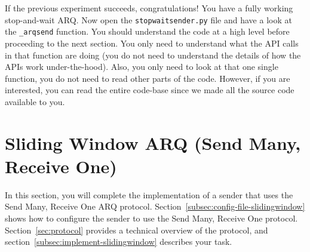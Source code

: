 \documentclass[11pt]{article}
\begin{document}




If the previous experiment succeeds, congratulations! You have a fully working stop-and-wait ARQ.
Now open the \texttt{stopwaitsender.py} file and have a look at the \texttt{\_arqsend} function.
You should understand the code at a high level before proceeding to the next section.
You only need to understand what the API calls in that function are doing (you do not need to understand the details of how the APIs work under-the-hood).
Also, you only need to look at that one single function, you do not need to read other parts of the code.
However, if you are interested, you can read the entire code-base since we made all the source code available to you.

\section{Sliding Window ARQ (Send Many, Receive One)}
\label{sec:sliding}
In this section, you will complete the implementation of a sender that uses the Send Many, Receive One ARQ protocol.
Section~\ref{subsec:config-file-slidingwindow} shows how to configure the sender to use the Send Many, Receive One protocol.
Section~\ref{sec:protocol} provides a technical overview of the protocol, and section~\ref{subsec:implement-slidingwindow} describes your task.
\end{document}
